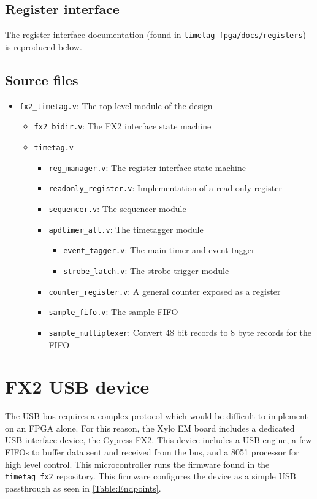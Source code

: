 \subsection{Register interface}
The register interface documentation (found in
{\tt timetag-fpga/docs/registers}) is reproduced below.



\subsection{Source files}
\begin{itemize}
  \item {\tt fx2\_timetag.v}: The top-level module of the design
  \begin{itemize}
    \item {\tt fx2\_bidir.v}: The FX2 interface state machine
    \item {\tt timetag.v}
    \begin{itemize}
      \item {\tt reg\_manager.v}: The register interface state machine
      \item {\tt readonly\_register.v}: Implementation of a read-only register
      \item {\tt sequencer.v}: The sequencer module
      \item {\tt apdtimer\_all.v}: The timetagger module
      \begin{itemize}
        \item {\tt event\_tagger.v}: The main timer and event tagger
        \item {\tt strobe\_latch.v}: The strobe trigger module
      \end{itemize}
      \item {\tt counter\_register.v}: A general counter exposed as a register
      \item {\tt sample\_fifo.v}: The sample FIFO
      \item {\tt sample\_multiplexer}: Convert 48 bit records to 8 byte records for the FIFO
    \end{itemize}
  \end{itemize}
\end{itemize}

\section{FX2 USB device}
The USB bus requires a complex protocol which would be difficult to
implement on an FPGA alone. For this reason, the Xylo EM board
includes a dedicated USB interface device, the Cypress FX2. This
device includes a USB engine, a few FIFOs to buffer data sent and
received from the bus, and a 8051 processor for high level
control. This microcontroller runs the firmware found in the
{\tt timetag\_fx2} repository. This firmware configures the device as
a simple USB passthrough as seen in \ref{Table:Endpoints}.

